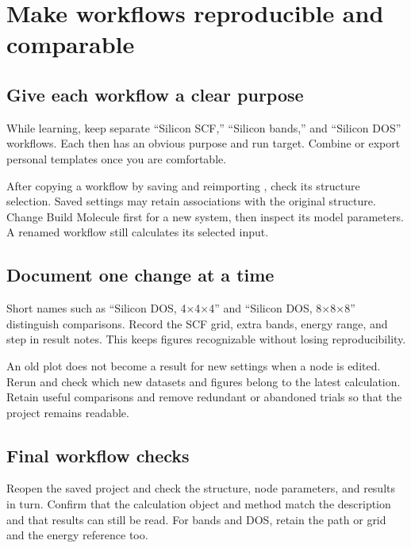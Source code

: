 \section{Make workflows reproducible and comparable}

\subsection{Give each workflow a clear purpose}

While learning, keep separate ``Silicon SCF,'' ``Silicon bands,'' and ``Silicon DOS'' workflows. Each then has an obvious purpose and run target. Combine or export personal templates once you are comfortable.

After copying a workflow by saving and reimporting , check its structure selection. Saved settings may retain associations with the original structure. Change Build Molecule first for a new system, then inspect its model parameters. A renamed workflow still calculates its selected input.

\subsection{Document one change at a time}

Short names such as ``Silicon DOS, 4×4×4'' and ``Silicon DOS, 8×8×8'' distinguish comparisons. Record the SCF grid, extra bands, energy range, and step in result notes. This keeps figures recognizable without losing reproducibility.

An old plot does not become a result for new settings when a node is edited. Rerun and check which new datasets and figures belong to the latest calculation. Retain useful comparisons and remove redundant or abandoned trials so that the project remains readable.

\subsection{Final workflow checks}

Reopen the saved project and check the structure, node parameters, and results in turn. Confirm that the calculation object and method match the description and that results can still be read. For bands and DOS, retain the path or grid and the energy reference too.

